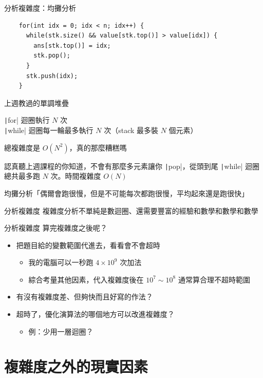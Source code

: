\documentclass[aspectratio=169]{beamer}
\newcommand{\inc}[2][cpp]{\texttt|#2|}
\begin{document}
\begin{frame}[fragile]{分析複雜度：均攤分析}
  \begin{verbatim}
    for(int idx = 0; idx < n; idx++) {
      while(stk.size() && value[stk.top()] > value[idx]) {
        ans[stk.top()] = idx;
        stk.pop();
      }
      stk.push(idx);
    }
  \end{verbatim}

   {
    上週教過的單調堆疊
  }
   {
    \inc{for} 迴圈執行 $N$ 次\\
    \inc{while} 迴圈每一輪最多執行 $N$ 次（stack 最多裝 $N$ 個元素）

    總複雜度是 $O(N^2)$，真的那麼糟糕嗎
  }
   {
    認真聽上週課程的你知道，不會有那麼多元素讓你 \inc{pop}，從頭到尾 \inc{while} 迴圈總共最多跑 $N$ 次。時間複雜度 $O(N)$

    均攤分析「偶爾會跑很慢，但是不可能每次都跑很慢，平均起來還是跑很快」
  }
\end{frame}

\begin{frame}{分析複雜度}
  複雜度分析不單純是數迴圈、還需要豐富的經驗和數學和數學和數學
\end{frame}

\begin{frame}{分析複雜度}
  算完複雜度之後呢？

  \begin{itemize}
    \item 把題目給的變數範圍代進去，看看會不會超時
    \begin{itemize}
      \item 我的電腦可以一秒跑 $4 \times 10^9$ 次加法
      \item 綜合考量其他因素，代入複雜度後在 $10^7 \sim 10^8$ 通常算合理不超時範圍
    \end{itemize}
    \item 有沒有複雜度差、但夠快而且好寫的作法？
    \item 超時了，優化演算法的哪個地方可以改進複雜度？
    \begin{itemize}
      \item 例：少用一層迴圈？
    \end{itemize}
  \end{itemize}
\end{frame}


\section{複雜度之外的現實因素}
\end{document}

